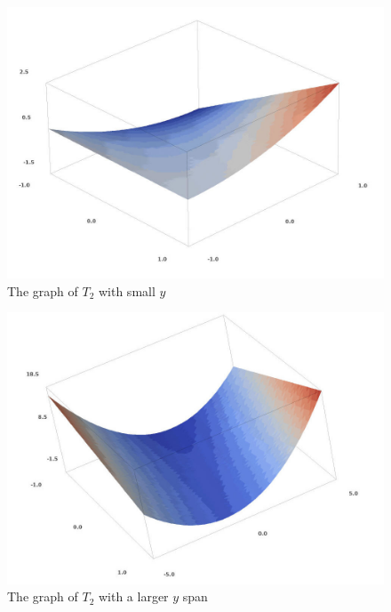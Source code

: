 \documentclass[a4paper,12pt]{article}
\begin{document}
\begin{figure}[H]
    \centering
    \includegraphics[scale=0.34]{3_t2_1.jpg}
    \caption{The graph of $T_{2}$ with small $y$}
    \label{3_t2_1}
\end{figure}
\begin{figure}[H]
    \centering
    \includegraphics[scale=0.34]{3_t2_2.jpg}
    \caption{The graph of $T_{2}$ with a larger $y$ span}
    \label{3_t2_2}
\end{figure}
\end{document}
